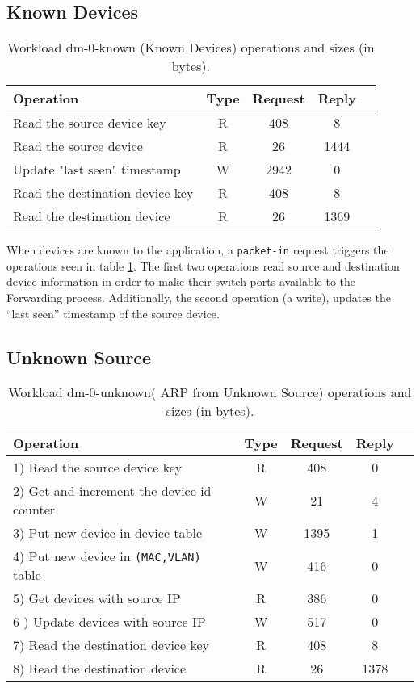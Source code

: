 {\subsection{Known Devices}

\begin{table}[ht]
\small
\centering 
\begin{tabular}{l c c c c}
Operation & Type & Request & Reply \\ \toprule 
Read the source device key & R & 408 & 8\\
Read the source device & R & 26 & 1444\\
Update "last seen" timestamp & W & 2942 & 0\\
Read the destination device key & R & 408 & 8\\
Read the destination device & R & 26 & 1369 \\
\end{tabular}
\caption[Workload dm-0-known (Known Devices) operations]{Workload
  dm-0-known (Known Devices) operations and sizes (in bytes).}
\label{table:ops:dm-0-known}
\end{table}

When devices are known to the application, a \texttt{packet-in} request
triggers the operations seen in table \ref{table:ops:dm-0-known}. The
first two operations read source and destination device
information in order to make their switch-ports available to the
Forwarding process. Additionally, the second operation (a write), 
updates the ``last seen'' timestamp of the source device.

\subsection{Unknown Source}
\small
\begin{table}[ht]
\centering 
\begin{tabular}{l c c c c}
Operation & Type & Request & Reply \\ \toprule 
1) Read the source device key & R & 408 & 0\\
2) Get and increment the device id counter & W & 21 & 4\\
3) Put new device in device table & W & 1395 & 1\\
4) Put new device in \texttt{(MAC,VLAN)} table & W & 416 & 0\\
5) Get devices with source IP & R & 386 & 0\\
6 ) Update devices with source IP & W & 517 & 0\\
7) Read the destination device key & R & 408 & 8\\
8) Read the destination device & R & 26 & 1378 \\\bottomrule
\end{tabular}
\caption[Workload dm-0-unknown( ARP from Unknown Source)
operations]{Workload dm-0-unknown( ARP from Unknown Source) operations
  and sizes (in bytes).}
\label{table:ops:dm-0-unknown}
\end{table}


}
